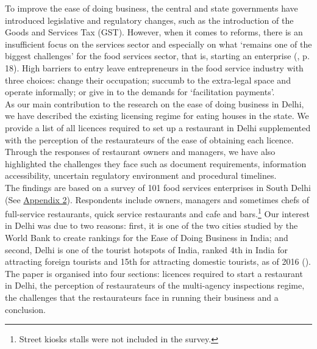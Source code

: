 \documentclass[a4paper, 12pt]{article}
\begin{document}
                    To improve the ease of doing business, the central and state governments have introduced legislative and regulatory changes, such as the introduction of the Goods and Services Tax (GST). However, when it comes to reforms, there is an insufficient 
focus on the services sector and especially on what ‘remains one of the biggest challenges’ for the food services sector, that is, starting an enterprise (\cite{kaushikpd2013formalinformal}, p. 18). High barriers to entry leave entrepreneurs in the food service industry with three choices: change their 
occupation; succumb to the extra-legal space and operate informally; or give in to the demands for ‘facilitation payments’.\\
                    
                    As our main contribution to the research on the ease of doing business in Delhi, we have described the existing licensing regime for eating houses in the state. We provide a list of all licences required to set up a restaurant in Delhi supplemented with 
the perception of the restaurateurs of the ease of obtaining each licence. Through the responses of restaurant owners and managers, we have also highlighted the challenges they face such as document requirements, information accessibility, uncertain regulatory 
environment and procedural timelines.\\
                    
                    The findings are based on a survey of 101 food services enterprises in South Delhi (See \hyperref[Appendix 2]{Appendix 2}). Respondents include owners, managers and sometimes chefs of full-service restaurants, quick service restaurants and cafe 
and bars.\footnote{Street kiosks stalls were not included in the survey.} Our interest in Delhi was due to two reasons: first, it is one of the two cities studied by the World Bank to create rankings for the Ease of Doing Business in India; and second, Delhi is one of the 
tourist hotspots of India, ranked 4th in India for attracting foreign tourists and 15th for attracting domestic tourists, as of 2016 (\cite{goitourismstats}). \\
                    
                    The paper is organised into four sections: licences required to start a restaurant in Delhi, the perception of restaurateurs of the multi-agency inspections regime, the challenges that the restaurateurs face in running their business and a conclusion. 
            
\end{document}
